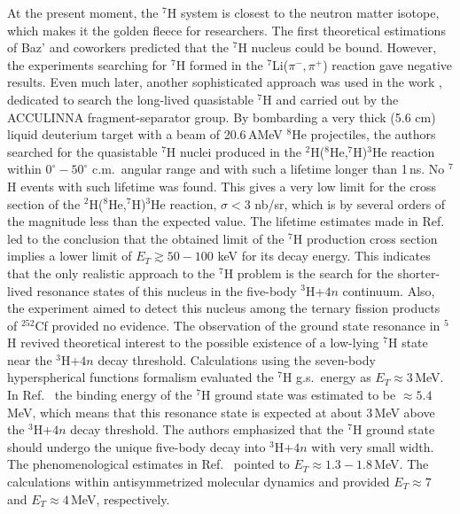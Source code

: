 At the present moment, the $^{7}$H system is closest to the neutron matter isotope, which makes it the golden fleece for researchers. 
The first theoretical estimations of Baz' and coworkers \cite{Baz:1972} predicted that the $^{7}$H nucleus could be bound.
However, the experiments \cite{Seth:1981,Evseev:1981} searching for $^{7}$H formed in the $^7$Li($\pi^-,\pi^+$) reaction gave negative results.
Even much later, another sophisticated approach was used in the work \cite{Golovkov:2004}, dedicated to search the long-lived quasistable $^{7}$H and carried out by the ACCULINNA fragment-separator group.
By bombarding a very thick (5.6 cm) liquid deuterium target with a beam of 20.6\,AMeV $^{8}$He  projectiles, the authors searched for the quasistable $^{7}$H nuclei produced in the $^2$H($^8$He,$^7$H)$^3$He reaction within $0^{\circ}-50^{\circ}$ c.m.\ angular range and with such a lifetime longer than 1\,ns.
No $^7$H events with such lifetime was found.
This gives a very low limit for the cross section of the $^2$H($^8$He,$^7$H)$^3$He reaction, $\sigma < 3$ nb/sr, which is by several orders of the magnitude less than the expected value.
The lifetime estimates made in Ref.\ \cite{Golovkov:2004} led to the conclusion that the obtained limit of the $^{7}$H production cross section implies a lower limit of $E_T \gtrsim 50-100$ keV for its decay energy.
This indicates that the only realistic approach to the $^7$H problem is the search for the shorter-lived resonance states of this nucleus in the five-body $^{3}$H+$4n$ continuum.
Also, the experiment \cite{Aleksandrov:1982} aimed to detect this nucleus among the ternary fission products of $^{252}$Cf provided no evidence.
The observation of the ground state resonance in $^{5}$H \cite{Korsheninnikov:2001} revived theoretical interest to the possible existence of a low-lying $^{7}$H  state near the $^{3}$H+$4n$ decay threshold.
Calculations using the seven-body hyperspherical functions formalism \cite{Timofeyuk:2002} evaluated the $^{7}$H g.s.\ energy as $E_{T} \approx 3$\,MeV.
In Ref.\ \cite{Korsheninnikov:2003} the binding energy of the $^{7}$H ground state was estimated to be $\approx 5.4$\,MeV, which means that this resonance state is expected at about 3\,MeV above the $^3$H+$4n$ decay threshold.
The authors emphasized that the $^{7}$H ground state should undergo the unique five-body decay into $^3$H+$4n$ with very small width. 
The phenomenological estimates in Ref.\ \cite{Golovkov:2004} pointed to $E_{T} \approx 1.3-1.8$\,MeV.
The calculations within antisymmetrized molecular dynamics \cite{Aoyama:2004} and \cite{Aoyama:2009} provided $E_{T} \approx 7$ and $E_{T} \approx 4$\,MeV, respectively.

